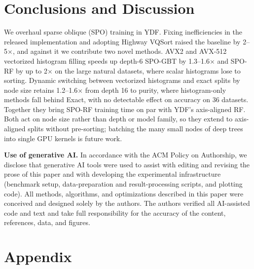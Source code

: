 \documentclass[sigconf]{acmart}%
\begin{document}
% 




\section{Conclusions and Discussion}

We overhaul sparse oblique (SPO) training in YDF. Fixing inefficiencies in the released implementation and adopting Highway VQSort raised the baseline by 2--5$\times$, and against it we contribute two novel methods. AVX2 and AVX-512 vectorized histogram filling speeds up depth-6 SPO-GBT by 1.3--1.6$\times$ and SPO-RF by up to 2$\times$ on the large natural datasets, where scalar histograms lose to sorting. Dynamic switching between vectorized histograms and exact splits by node size retains 1.2--1.6$\times$ from depth 16 to purity, where histogram-only methods fall behind Exact, with no detectable effect on accuracy on 36 datasets. Together they bring SPO-RF training time on par with YDF's axis-aligned RF. Both act on node size rather than depth or model family, so they extend to axis-aligned splits without pre-sorting; batching the many small nodes of deep trees into single GPU kernels is future work.

\begin{acks}
\textbf{Use of generative AI.} In accordance with the ACM Policy on Authorship,
we disclose that generative AI tools were used to assist with
editing and revising the prose of this paper and with developing the
experimental infrastructure (benchmark setup, data-preparation and
result-processing scripts, and plotting code). All methods, algorithms, and
optimizations described in this paper were conceived and designed solely by the
authors. The authors verified all AI-assisted code and text and take full
responsibility for the accuracy of the content, references, data, and figures.
\end{acks}




\appendix

\section{Appendix}
\end{document}
